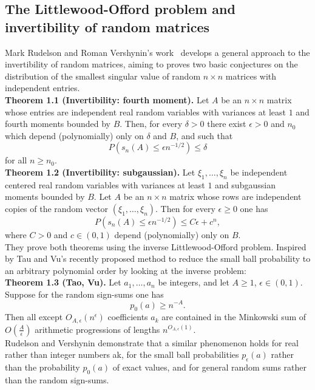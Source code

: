 \subsection{The Littlewood-Offord problem and invertibility of random matrices}

Mark Rudelson and Roman Vershynin's work~\cite{rudelson2008littlewood} develops a general approach to the invertibility of random matrices, aiming to proves two basic conjectures on the distribution of the smallest singular value of random \(n \times n\) matrices with independent entries.\\

\textbf{Theorem 1.1 (Invertibility: fourth moment).} Let \(A\) be an \(n \times n\) matrix whose entries are independent real random variables with variances at least \(1\) and fourth moments bounded by \(B\). Then, for every \(\delta > 0\) there exist \(\epsilon > 0\) and \(n_0\) which depend (polynomially) only on \(\delta\) and \(B\), and such that
\[P(s_n(A) \leq \epsilon n^{-1/2}) \leq \delta\] for all \(n \geq n_0\).\\

\textbf{Theorem 1.2 (Invertibility: subgaussian).} Let \(\xi_1, \ldots, \xi_n\) be independent centered real random variables with variances at least \(1\) and subgaussian moments bounded by \(B\). Let \(A\) be an \(n \times n\) matrix whose rows are independent copies of the random vector \((\xi_1, \ldots, \xi_n)\). Then for every \(\epsilon \geq 0\) one has
\[P(s_n(A) \leq \epsilon n^{-1/2}) \leq C\epsilon + c^n,\] where \(C > 0\) and \(c \in (0, 1)\) depend (polynomially) only on \(B\).\\

They prove both theorems using the inverse Littlewood-Offord problem. Inspired by Tau and Vu's recently proposed method to reduce the small ball probability to an arbitrary polynomial order by looking at the inverse problem:\\

\textbf{Theorem 1.3 (Tao, Vu).} Let \(a_1, \ldots, a_n\) be integers, and let \(A \geq 1\), \(\epsilon \in (0, 1)\). Suppose for the random sign-sums one has
\[p_0(a) \geq n^{-A}.\]
Then all except \(O_{A,\epsilon}(n^{\epsilon})\) coefficients \(a_k\) are contained in the Minkowski sum of \(O\left(\frac{A}{\epsilon}\right)\) arithmetic progressions of lengths \(n^{O_{A,\epsilon}(1)}\).\\

Rudelson and Vershynin demonstrate that a similar phenomenon holds for real rather than integer numbers ak, for the small ball probabilities \(p_{\epsilon}(a)\) rather than the probability \(p_{0}(a)\) of exact values, and for general random sums rather than the random sign-sums.\\

